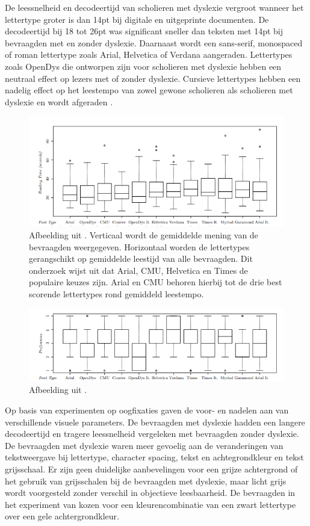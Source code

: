 De leessnelheid en decodeertijd van scholieren met dyslexie vergroot wanneer het lettertype groter is dan 14pt bij digitale en uitgeprinte documenten. De decodeertijd bij 18 tot 26pt was significant sneller dan teksten met 14pt bij bevraagden met en zonder dyslexie. Daarnaast wordt een sans-serif, monospaced of roman lettertype zoals Arial, Helvetica of Verdana aangeraden. Lettertypes zoals OpenDys die ontworpen zijn voor scholieren met dyslexie hebben een neutraal effect op lezers met of zonder dyslexie. Cursieve lettertypes hebben een nadelig effect op het leestempo van zowel gewone scholieren als scholieren met dyslexie en wordt afgeraden \autocite{Rello2013b, Rello2015}.

\begin{figure}
	\includegraphics{img/fonts-readability.png}
	\caption{Afbeelding uit \textcite{Rello2013b}. Verticaal wordt de gemiddelde mening van de bevraagden weergegeven. Horizontaal worden de lettertypes gerangschikt op gemiddelde leestijd van alle bevraagden. Dit onderzoek wijst uit dat Arial, CMU, Helvetica en Times de populaire keuzes zijn. Arial en CMU behoren hierbij tot de drie best scorende lettertypes rond gemiddeld leestempo.}
\end{figure}

\begin{figure}
	\includegraphics{img/fonts-preference.png}
	\caption{Afbeelding uit \textcite{Rello2013b}.}
\end{figure}

Op basis van experimenten op oogfixaties gaven \textcite{Rello2015} de voor- en nadelen aan van verschillende visuele parameters. De bevraagden met dyslexie hadden een langere decodeertijd en tragere leessnelheid vergeleken met bevraagden zonder dyslexie. De bevraagden met dyslexie waren meer gevoelig aan de veranderingen van tekstweergave bij lettertype, character spacing, tekst en achtegrondkleur en tekst grijsschaal. Er zijn geen duidelijke aanbevelingen voor een grijze achtergrond of het gebruik van grijsschalen bij de bevraagden met dyslexie, maar licht grijs wordt voorgesteld zonder verschil in objectieve leesbaarheid. De bevraagden in het experiment van \textcite{Rello2015} kozen voor een kleurencombinatie van een zwart lettertype over een gele achtergrondkleur.

